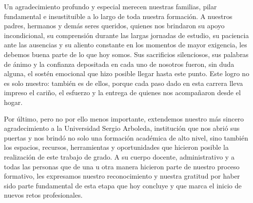 Un agradecimiento profundo y especial merecen nuestras familias, pilar fundamental e insustituible a lo largo de toda nuestra formaci\'on. A nuestros padres, hermanos y dem\'as seres queridos, quienes nos brindaron su apoyo incondicional, su comprensi\'on durante las largas jornadas de estudio, su paciencia ante las ausencias y su aliento constante en los momentos de mayor exigencia, les debemos buena parte de lo que hoy somos. Sus sacrificios silenciosos, sus palabras de \'animo y la confianza depositada en cada uno de nosotros fueron, sin duda alguna, el sost\'en emocional que hizo posible llegar hasta este punto. Este logro no es solo nuestro: tambi\'en es de ellos, porque cada paso dado en esta carrera lleva impreso el cari\~no, el esfuerzo y la entrega de quienes nos acompa\~naron desde el hogar.

Por \'ultimo, pero no por ello menos importante, extendemos nuestro m\'as sincero agradecimiento a la Universidad Sergio Arboleda, instituci\'on que nos abri\'o sus puertas y nos brind\'o no solo una formaci\'on acad\'emica de alto nivel, sino tambi\'en los espacios, recursos, herramientas y oportunidades que hicieron posible la realizaci\'on de este trabajo de grado. A su cuerpo docente, administrativo y a todas las personas que de una u otra manera hicieron parte de nuestro proceso formativo, les expresamos nuestro reconocimiento y nuestra gratitud por haber sido parte fundamental de esta etapa que hoy concluye y que marca el inicio de nuevos retos profesionales.

\newpage
